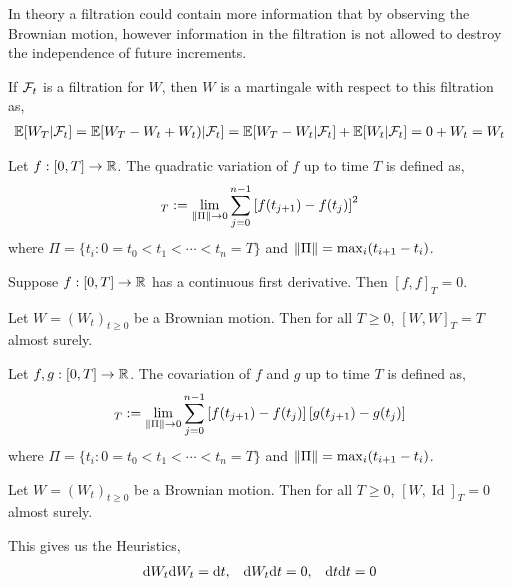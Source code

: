 \documentclass[12pt]{article}
\begin{document}
In theory a filtration could contain more information that by observing the Brownian motion, however information in the filtration is not allowed to destroy the independence of future increments.

If \( \mathcal{F}_t \) is a filtration for \( W \), then \( W \) is a martingale with respect to this filtration as,
\begin{align*}
    \mathbb{E}[ W_T | \mathcal{F}_t] = \mathbb{E}[W_T - W_t  + W_t) | \mathcal{F}_t]
    = \mathbb{E}[W_T - W_t | \mathcal{F}_t] + \mathbb{E}[ W_t | \mathcal{F}_t]
    = 0 + W_t = W_t
\end{align*}

\begin{definition}
Let \( f : [0,T]\to\mathbb{R} \). The quadratic variation of \( f \) up to time \( T \) is defined as,
\begin{align*}
    [f,f]_T := \lim_{\norm{\Pi}\to 0} \sum_{j=0}^{n-1} \left[ f(t_{j+1})-f(t_j) \right]^2
\end{align*}
where \( \Pi = \{t_i : 0=t_0<t_1 < \cdots < t_n = T\} \) and \( \left\lVert\Pi\right\rVert = \max_i (t_{i+1} - t_i) \).
\end{definition}

\begin{lemma}
Suppose \( f:[0,T]\to \mathbb{R} \) has a continuous first derivative. Then \( [f,f]_T = 0 \).
\end{lemma}

\begin{theorem}
Let \( W = (W_t)_{t\geq 0} \) be a Brownian motion. Then for all \( T\geq0 \), \( [W,W]_T = T \) almost surely.
\end{theorem}

\begin{definition}[Covariation]
Let \( f,g : [0,T]\to\mathbb{R} \). The covariation of \( f \) and \( g \) up to time \( T \) is defined as,
\begin{align*}
    [f,g]_T := \lim_{\norm{\Pi}\to 0} \sum_{j=0}^{n-1} \left[ f(t_{j+1})-f(t_j) \right]\left[ g(t_{j+1})-g(t_j) \right]
\end{align*}
where \( \Pi = \{t_i : 0=t_0<t_1 < \cdots < t_n = T\} \) and \( \left\lVert\Pi\right\rVert = \max_i (t_{i+1} - t_i) \).
\end{definition}

\begin{theorem}
Let \( W = (W_t)_{t\geq 0} \) be a Brownian motion. Then for all \( T\geq0 \), \( [W,\operatorname{Id}]_T = 0 \) almost surely.
\end{theorem}

This gives us the Heuristics,
\begin{align*}
    \mathrm{d} W_t \mathrm{d} W_t = \mathrm{d} t, && \mathrm{d} W_t \mathrm{d} t = 0, && \mathrm{d} t\mathrm{d} t = 0
\end{align*}
\end{document}
